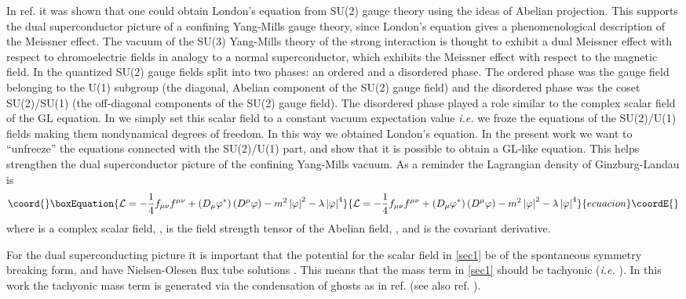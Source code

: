 \documentclass[a4paper,aps,showpacs]{revtex4}
\begin{document}
In ref. \cite{dzhsin02a} it was shown that one could obtain
London's equation from SU(2) gauge theory using the ideas of
Abelian projection. This supports
the dual superconductor picture of a confining Yang-Mills gauge
theory, since London's equation gives a phenomenological 
description of the Meissner effect. The vacuum of the SU(3) Yang-Mills
theory of the strong interaction
is thought to exhibit a dual Meissner effect with respect to
chromoelectric fields in analogy to a normal superconductor, which 
exhibits the Meissner effect with respect to the magnetic field.
In \cite{dzhsin02a} the quantized SU(2) gauge fields split into two phases: 
an ordered and  a disordered phase. The ordered phase was the gauge field 
belonging to  the U(1) subgroup (the diagonal,  Abelian component of 
the SU(2) gauge field) and the disordered phase was the coset SU(2)/SU(1) 
(the off-diagonal components of the SU(2) gauge field). The disordered phase
played a role similar to the complex scalar field of the GL 
equation. In \cite{dzhsin02a} we simply set this scalar field to a constant 
vacuum expectation value {\it i.e.} we froze the equations of the SU(2)/U(1)
fields making them nondynamical degrees of freedom. In this way we obtained
London's equation. In the present work we want to ``unfreeze'' the
equations connected with the SU(2)/U(1) part, and show that it is possible
to obtain a GL-like equation. This
helps strengthen the dual superconductor picture of the confining 
Yang-Mills vacuum. As a reminder the Lagrangian density of
Ginzburg-Landau is
\begin{equation}\coord{}\boxEquation{
\label{sec1}
{\mathcal L} = - \frac{1}{4}f_{\mu \nu} f^{\mu \nu} + 
   \left( D_\mu \varphi^* \right) \left( D^\mu \varphi \right) - 
   m^2 \left| \varphi \right|^2  - \lambda \left| \varphi \right|^4 
}{
{\mathcal L} = - \frac{1}{4}f_{\mu \nu} f^{\mu \nu} + 
   \left( D_\mu \varphi^* \right) \left( D^\mu \varphi \right) - 
   m^2 \left| \varphi \right|^2  - \lambda \left| \varphi \right|^4 
}{ecuacion}\coordE{}\end{equation}
where \myHighlight{$\varphi$}\coordHE{} is a complex scalar field, \coordHE{}, is the field strength tensor of the Abelian
field, \coordHE{}, and \coordHE{} is the
covariant derivative. 

For the dual superconducting picture it is important that the potential
for the scalar field in \eqref{sec1} be of the spontaneous symmetry breaking
form, and have Nielsen-Olesen flux tube solutions \cite{no}. 
This means that the mass term in \eqref{sec1} should 
be tachyonic ({\it i.e.} \coordHE{}). In this work the tachyonic mass term 
is generated via the condensation of ghosts as in ref. \cite{dudal} (see
also ref. \cite{lemes}). 
\end{document}
